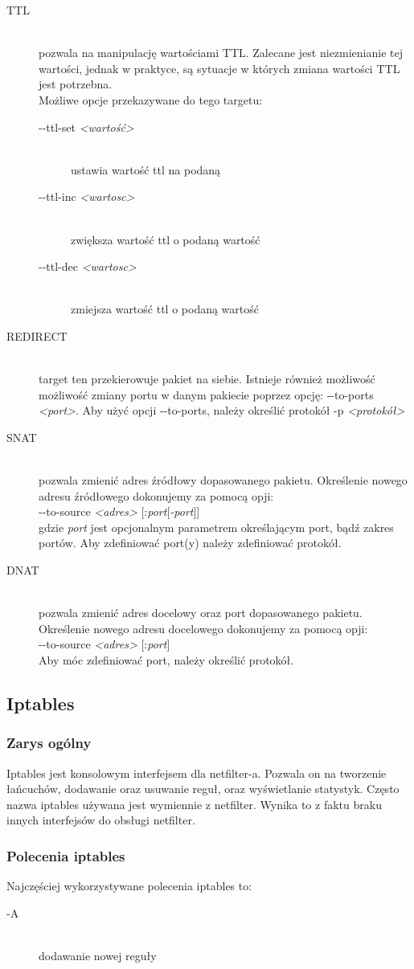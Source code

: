 \documentclass[a4paper,10pt,twoside]{book}
\newcommand{\param}[1]{\textit{\textless #1\textgreater}}
\begin{document}
\begin{description}
					\item[TTL] \hfill \\
						pozwala na manipulację wartościami TTL. Zalecane jest niezmienianie tej wartości, jednak w praktyce, są sytuacje w których zmiana wartości TTL jest potrzebna.\\
						Możliwe opcje przekazywane do tego targetu:
						\begin{description}
							\item[-{}-ttl-set \param{wartość}] \hfill \\
								ustawia wartość ttl na podaną
							\item[-{}-ttl-inc \param{wartosc}] \hfill \\
								zwiększa wartość ttl o podaną wartość
							\item[-{}-ttl-dec \param{wartosc}] \hfill \\
								zmiejsza wartość ttl o podaną wartość
						\end{description}
					\item[REDIRECT] \hfill \\
						target ten przekierowuje pakiet na siebie. Istnieje również możliwość możliwość zmiany portu w danym pakiecie poprzez opcję: -{}-to-ports \param{port}.
						Aby użyć opcji -{}-to-ports, należy określić protokół -p \param{protokół}
					\item[SNAT] \hfill \\
						pozwala zmienić adres źródłowy dopasowanego pakietu. Określenie nowego adresu źródłowego dokonujemy za pomocą opji:\\
						-{}-to-source \param{adres} [:\textit{port}[\textit{-port}]]\\
						gdzie \textit{port} jest opcjonalnym parametrem określającym port, bądź zakres portów. Aby zdefiniować port(y) należy zdefiniować protokół.
					\item[DNAT] \hfill \\
						pozwala zmienić adres docelowy oraz port dopasowanego pakietu. Określenie nowego adresu docelowego dokonujemy za pomocą opji:\\
						-{}-to-source \param{adres} [:\textit{port}]\\
						Aby móc zdefiniować port, należy określić protokół.
				\end{description}
	\subsection{Iptables}
		\subsubsection{Zarys ogólny}
			Iptables jest konsolowym interfejsem dla netfilter-a. Pozwala on na tworzenie łańcuchów, dodawanie oraz usuwanie reguł, oraz wyświetlanie statystyk.
			Często nazwa iptables używana jest wymiennie z netfilter. Wynika to z faktu braku innych interfejsów do obsługi netfilter.
		\subsubsection{Polecenia iptables}
			Najczęściej wykorzystywane polecenia iptables to:
			\begin{description}
				\item[-A] \hfill \\
					dodawanie nowej reguły 
			\end{description}
\end{document}
